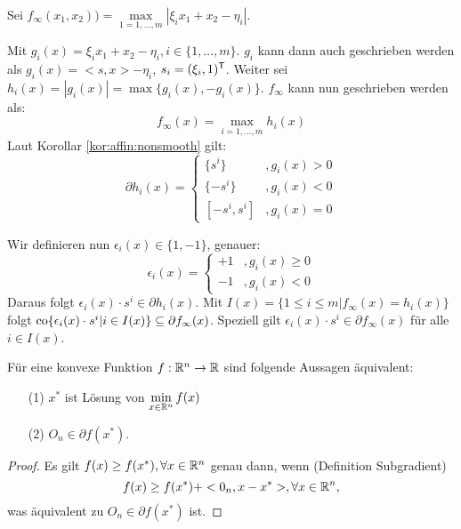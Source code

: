 \begin{Beispiel}
 Sei $f_\infty(x_1,x_2)) = \max\limits_{1=1,\dots,m} |\xi_i x_1+x_2-\eta_i|$.
 
 Mit $g_i(x) = \xi_i x_1 +x_2 -\eta_i, i\in\{1,\dots,m\}$. $g_i$ kann dann auch geschrieben werden als $g_i(x) = 
<s,x>-\eta_i$, $s_i=(\xi_i,1)^\mathsf{T}$. Weiter sei $h_i(x) = |g_i(x)| = \max\{g_i(x),-g_i(x)\}$. $f_\infty$ kann nun 
geschrieben werden als:
\begin{equation}
 f_\infty(x) = \max\limits_{i=1,\dots,m} h_i(x)
\end{equation}
Laut Korollar \ref{kor:affin:nonsmooth} gilt:
\begin{equation}
 \partial  h_i(x) = 
 \begin{cases}
  \{s^i\} & ,g_i(x) > 0\\
  \{-s^i\} & ,g_i(x) < 0\\
  [-s^i,s^i] & ,g_i(x) = 0
 \end{cases}
\end{equation}

Wir definieren nun $\epsilon_i(x) \in \{1,-1\}$, genauer:
\begin{equation}
 \epsilon_i(x) = 
 \begin{cases}
  +1 & ,g_i(x) \geq 0\\
  -1 & ,g_i(x) < 0
 \end{cases}
\end{equation}
Daraus folgt $\epsilon_i(x) \cdot s^i \in\partial h_i(x).$ Mit $I(x) = \{1\leq i\leq m|f_\infty (x) = h_i(x)\}$ 
folgt $\operatorname{co}\{\epsilon_i(x)\cdot s^i|i\in I(x)\}\subseteq \partial f_\infty(x)$. Speziell gilt $\epsilon_i(x) \cdot 
s^i\in\partial f_\infty(x)$ für alle $i\in I(x)$.
\end{Beispiel}

\begin{Satz}
 Für eine konvexe Funktion $f:\mathbb R^n\rightarrow\mathbb R$ sind folgende Aussagen äquivalent:
 \begin{enumerate}
  \item[(1)] $x^*$ ist Lösung von $\min\limits_{x\in\mathbb R^n} f(x)$
  \item[(2)] $O_n\in\partial f(x^*)$.
 \end{enumerate}
\end{Satz}

\begin{proof}
 Es gilt $f(x)\geq f(x^*), \forall x\in\mathbb R^n$ genau dann, wenn (Definition Subgradient)
 \begin{equation}
  f(x) \geq f(x^*) + <0_n,x-x^*>, \forall x\in\mathbb R^n,
 \end{equation}
 was äquivalent zu $O_n\in\partial f(x^*)$ ist.
\end{proof}

